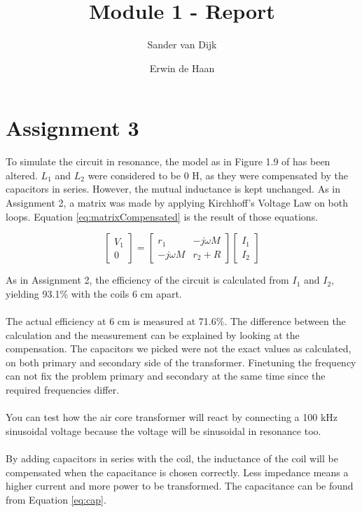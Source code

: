 \documentclass[final]{scrreprt} %
\title{Module 1 - Report}
\author{Sander {van Dijk} \and Erwin {de Haan}}
\begin{document}
\chapter{Assignment 3}

To simulate the circuit in resonance, the model as in Figure 1.9 of \cite{epo4-manual} has been altered. $L_1$ and $L_2$ were considered to be 0 H, as they were compensated by the capacitors in series. However, the mutual inductance is kept unchanged. As in Assignment 2, a matrix was made by applying Kirchhoff's Voltage Law on both loops. Equation \ref{eq:matrixCompensated} is the result of those equations.

\begin{equation}
	\begin{bmatrix}
		V_1 \\
		0
	\end{bmatrix} =
	\begin{bmatrix}
		 r_1 & -j \omega M \\
		-j \omega M & r_2 + R
	\end{bmatrix}
	\begin{bmatrix}
		I_1 \\
		I_2
	\end{bmatrix}
	\label{eq:matrixCompensated}
\end{equation}

As in Assignment 2, the efficiency of the circuit is calculated from $I_1$ and $I_2$, yielding 93.1\% with the coils 6 cm apart.
\\ \\
The actual efficiency at 6 cm is measured at 71.6\%.
The difference between the calculation and the measurement can be explained by looking at the compensation.
The capacitors we picked were not the exact values as calculated, on both primary and secondary side of the transformer.
Finetuning the frequency can not fix the problem primary and secondary at the same time since the required frequencies differ.
\\ \\
You can test how the air core transformer will react by connecting a 100 kHz sinusoidal voltage because the voltage will be sinusoidal in resonance too.
\\ \\ 
By adding capacitors in series with the coil, the inductance of the coil will be compensated when the capacitance is chosen correctly. Less impedance means a higher current and more power to be transformed. The capacitance can be found from Equation \ref{eq:cap}.
\end{document}
